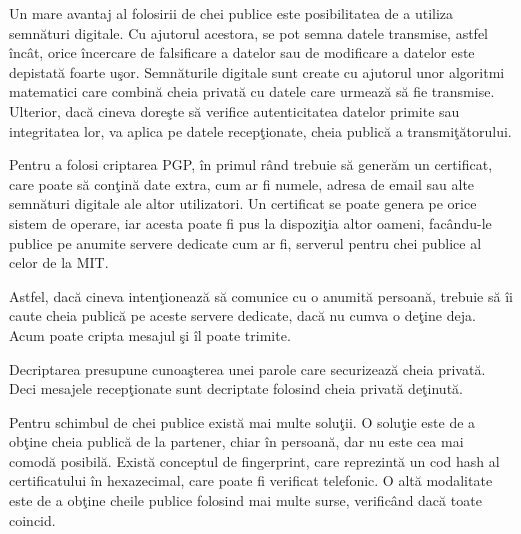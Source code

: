 
	Un mare avantaj al folosirii de chei publice este posibilitatea de a utiliza semn\u{a}turi digitale. Cu ajutorul acestora, se pot semna datele transmise, astfel \^{i}nc\^{a}t, orice \^{i}ncercare de falsificare a datelor sau de modificare a datelor este depistat\u{a} foarte u\c{s}or. Semn\u{a}turile digitale sunt create cu ajutorul unor algoritmi matematici care combin\u{a} cheia privat\u{a} cu datele care urmeaz\u{a} s\u{a} fie transmise. Ulterior, dac\u{a} cineva dore\c{s}te s\u{a} verifice autenticitatea datelor primite sau integritatea lor, va aplica pe datele recep\c{t}ionate, cheia public\u{a} a transmi\c{t}\u{a}torului. 

	Pentru a folosi criptarea PGP, \^{i}n primul r\^{a}nd trebuie s\u{a} gener\u{a}m un certificat, care poate s\u{a} con\c{t}in\u{a} date extra, cum ar fi numele, adresa de email sau alte semn\u{a}turi digitale ale altor utilizatori. Un certificat se poate genera pe orice sistem de operare, iar acesta poate fi pus la dispozi\c{t}ia altor oameni, fac\^{a}ndu-le publice pe anumite servere dedicate cum ar fi, serverul pentru chei publice al celor de la MIT.

	Astfel, dac\u{a} cineva inten\c{t}ioneaz\u{a} s\u{a} comunice cu o anumit\u{a} persoan\u{a}, trebuie s\u{a} \^{i}i caute cheia public\u{a} pe aceste servere dedicate, dac\u{a} nu cumva o de\c{t}ine deja. Acum poate cripta mesajul \c{s}i \^{i}l poate trimite. 

	Decriptarea presupune cunoa\c{s}terea unei parole care securizeaz\u{a} cheia privat\u{a}. Deci mesajele recep\c{t}ionate sunt decriptate folosind cheia privat\u{a} de\c{t}inut\u{a}.


	Pentru schimbul de chei publice exist\u{a} mai multe solu\c{t}ii. O solu\c{t}ie este de a ob\c{t}ine cheia public\u{a} de la partener, chiar \^{i}n persoan\u{a}, dar nu este cea mai comod\u{a} posibil\u{a}. Exist\u{a} conceptul de fingerprint, care reprezint\u{a} un cod hash al certificatului \^{i}n hexazecimal, care poate fi verificat telefonic. O alt\u{a} modalitate este de a ob\c{t}ine cheile publice folosind mai multe surse, verific\^{a}nd dac\u{a} toate coincid.

